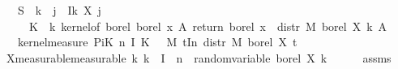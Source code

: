 \begin{isabellebody}
{\ \ \ {\isachardoublequoteopen}S\ {\isasymequiv}\ {\isacharparenleft}{\kern0pt}{\isasymlambda}k\ {\isasymomega}{\isachardot}{\kern0pt}\ {\isasymSum}j\ {\isasymin}\ {\isacharparenleft}{\kern0pt}I{\isacharbackquote}{\kern0pt}{\isacharbraceleft}{\kern0pt}{}{\isachardot}{\kern0pt}{\isachardot}{\kern0pt}k{\isacharbraceright}{\kern0pt}{\isacharparenright}{\kern0pt}{\isachardot}{\kern0pt}\ X\ j\ {\isasymomega}{\isacharparenright}{\kern0pt}{\isachardoublequoteclose}\isanewline
\ \ \ \ \ {\isachardoublequoteopen}K\ {\isasymequiv}\ {\isacharparenleft}{\kern0pt}{\isasymlambda}k{\isachardot}{\kern0pt}\ kernel{\isacharunderscore}{\kern0pt}of\ borel\ borel\ {\isacharparenleft}{\kern0pt}{\isasymlambda}x\ A{\isacharprime}{\kern0pt}{\isachardot}{\kern0pt}\ {\isacharparenleft}{\kern0pt}{\isacharparenleft}{\kern0pt}return\ borel\ x{\isacharparenright}{\kern0pt}\ {\isasymstar}\ {\isacharparenleft}{\kern0pt}distr\ M\ borel\ {\isacharparenleft}{\kern0pt}X\ k{\isacharparenright}{\kern0pt}{\isacharparenright}{\kern0pt}{\isacharparenright}{\kern0pt}\ A{\isacharprime}{\kern0pt}{\isacharparenright}{\kern0pt}{\isacharparenright}{\kern0pt}{\isachardoublequoteclose}\isanewline
\ \ \ {\isachardoublequoteopen}kernel{\isacharunderscore}{\kern0pt}measure\ {\isacharparenleft}{\kern0pt}PiK\ n\ I\ K{\isacharparenright}{\kern0pt}\ {}\ {\isacharequal}{\kern0pt}\ {\isacharparenleft}{\kern0pt}{\isasymPi}\isactrlsub M\ t{\isasymin}I{\isacharbackquote}{\kern0pt}{\isacharbraceleft}{\kern0pt}{}{\isachardot}{\kern0pt}{\isachardot}{\kern0pt}n{\isacharbraceright}{\kern0pt}{\isachardot}{\kern0pt}\ distr\ M\ borel\ {\isacharparenleft}{\kern0pt}X\ t{\isacharparenright}{\kern0pt}{\isacharparenright}{\kern0pt}{\isachardoublequoteclose}%
}%
%
\isadelimproof
%
\endisadelimproof
%
\isatagproof
{}\isamarkupfalse%
\ {\isacharminus}{\kern0pt}\isanewline
\ \ \isamarkupfalse%
\ X{\isacharunderscore}{\kern0pt}measurable{\isacharbrackleft}{\kern0pt}measurable{\isacharbrackright}{\kern0pt}{\isacharcolon}{\kern0pt}\ {\isachardoublequoteopen}{\isasymAnd}k{\isachardot}{\kern0pt}\ k\ {\isasymin}\ I\ {\isacharbackquote}{\kern0pt}\ {\isacharbraceleft}{\kern0pt}{}{\isachardot}{\kern0pt}{\isachardot}{\kern0pt}n{\isacharbraceright}{\kern0pt}\ {\isasymLongrightarrow}\ random{\isacharunderscore}{\kern0pt}variable\ borel\ {\isacharparenleft}{\kern0pt}X\ k{\isacharparenright}{\kern0pt}{\isachardoublequoteclose}\isanewline
\ \ \ \ \isamarkupfalse%
\ assms{\isacharparenleft}{\kern0pt}{}{\isacharparenright}{\kern0pt}\ \isamarkupfalse%

\end{isabellebody}
